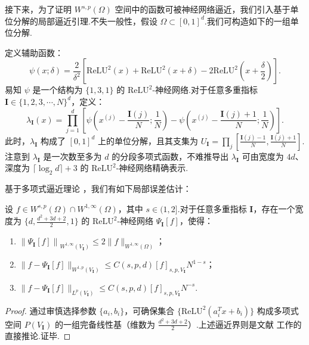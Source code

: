 接下来，为了证明 $W^{s,p}(\Omega)$ 空间中的函数可被神经网络逼近，我们引入基于单位分解的局部逼近引理.不失一般性，假设 $\Omega\subset [0,1]^{d}$.我们可构造如下的一组单位分解.
\begin{definition}
定义辅助函数：
\begin{equation*}
\psi(x;\delta) = \frac{2}{\delta^{2}}\left[\mathrm{ReLU}^{2}(x)+\mathrm{ReLU}^{2}(x+\delta)-2\mathrm{ReLU}^{2}(x+\frac{\delta}{2})\right].
\end{equation*}
易知 $\psi$ 是一个结构为 $\{1,3,1\}$ 的 $\mathrm{ReLU}^{2}$-神经网络.对于任意多重指标 $\mathbf{I}\in \{1,2,3,\cdots,N\}^{d}$，定义：
\begin{equation*}
\lambda_{\mathbf{I}}(x)=\prod_{j=1}^d\left[\psi\left(x^{(j)}-\frac{\mathbf{I}(j)}{N} ; \frac{1}{N}\right)-\psi\left(x^{(j)}-\frac{\mathbf{I}(j)+1}{N} ; \frac{1}{N}\right)\right].
\end{equation*}
此时，$\lambda_{\mathbf{I}}$ 构成了 $[0,1]^{d}$ 上的单位分解，且其支集为 $U_{\mathbf{I}}=\prod_{j}[\frac{\mathbf{I}(j)-1}{N},\frac{\mathbf{I}(j)+1}{N}]$.
注意到 $\lambda_{\mathbf{I}}$ 是一次数至多为 $d$ 的分段多项式函数，不难推导出 $\lambda_{\mathbf{I}}$ 可由宽度为 $4d$、深度为 $\lceil \log_{2}d\rceil+3$ 的 $\mathrm{ReLU}^{2}$-神经网络精确表示.
\end{definition}

基于多项式逼近理论 \cite{arcangeli1984estimation}，我们有如下局部误差估计：
\begin{lemma}[局部逼近]
设 $f\in W^{s,p}(\Omega)\cap W^{1,\infty}(\Omega)$，其中 $s\in (1,2]$.对于任意多重指标 $\mathbf{I}$，存在一个宽度为 $\{d,\frac{d^{2}+3d+2}{2},1\}$ 的 $\mathrm{ReLU}^{2}$-神经网络 $\Psi_{\mathbf{I}}[f]$，使得：
\begin{enumerate}
    \item $\left\|\Psi_{\mathbf{I}}[f]\right\|_{W^{1,\infty}(V_{\mathbf{I}})}\leq 2\|f\|_{W^{1,\infty}(\Omega)}$；
    \item $\|f-\Psi_{\mathbf{I}}[f]\|_{W^{1,p}(V_{\mathbf{I}})}\leq C(s,p,d)[f]_{s,p,V_{\mathbf{I}}}N^{1-s}$；
    \item $\|f-\Psi_{\mathbf{I}}[f]\|_{L^{p}(V_{\mathbf{I}})}\leq C(s,p,d)[f]_{s,p,V_{\mathbf{I}}}N^{-s}$.
\end{enumerate}
\end{lemma}
\begin{proof}
通过审慎选择参数 $\{a_{i},b_{i}\}$，可确保集合 $\{\mathrm{ReLU}^{2}(a_{i}^{T}x+b_{i})\}$ 构成多项式空间 $P(V_{\mathbf{I}})$ 的一组完备线性基（维数为 $\frac{d^{2}+3d+2}{2}$）.上述逼近界则是文献 \cite{arcangeli1984estimation} 工作的直接推论.证毕.
\end{proof}

